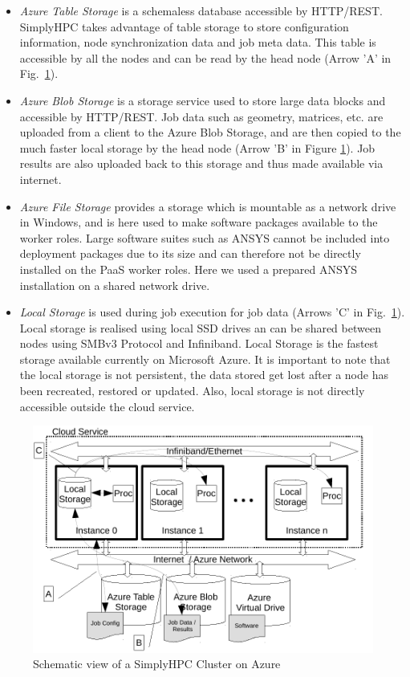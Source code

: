 \documentclass[3p,times]{elsarticle}
\begin{document}
\begin{itemize}

	\item \textit{Azure Table Storage} is a schemaless database accessible by HTTP/REST. SimplyHPC takes advantage of table storage to store configuration information, node synchronization data and job meta data. This table is accessible by all the nodes and can be read by the head node (Arrow 'A' in Fig.~\ref{fig:schemaService}).
	
	\item \textit{Azure Blob Storage} is a storage service used to store large data blocks and accessible by HTTP/REST. Job data such as geometry, matrices, etc. are uploaded from a client to the Azure Blob Storage, and are then copied to the much faster local storage by the head node (Arrow 'B' in Figure \ref{fig:schemaService}). Job results are also uploaded back to this storage and thus made available via internet.	
	
	\item \textit{Azure File Storage} provides a storage which is mountable as a network drive in Windows, and is here used to make software packages available to the worker roles. Large software suites such as ANSYS cannot be included into deployment packages due to its size and can therefore not be directly installed on the PaaS worker roles. Here we used a prepared ANSYS installation on a shared network drive.
	
	\item \textit{Local Storage} is used during job execution for job data (Arrows 'C' in Fig.~\ref{fig:schemaService}). Local storage is realised using local SSD drives an can be shared between nodes using SMBv3 Protocol and Infiniband. Local Storage is the fastest storage available currently on Microsoft Azure. It is important to note that the local storage is not persistent, the data stored get lost after a node has been recreated, restored or updated. Also, local storage is not directly accessible outside the cloud service.

\end{itemize}


\begin{figure}[ht]
	\centering
	\includegraphics[width=.6\linewidth]{azureDeployment.pdf}

	\caption{Schematic view of a SimplyHPC Cluster on Azure}	
	\label{fig:schemaService}
\end{figure}
\end{document}
